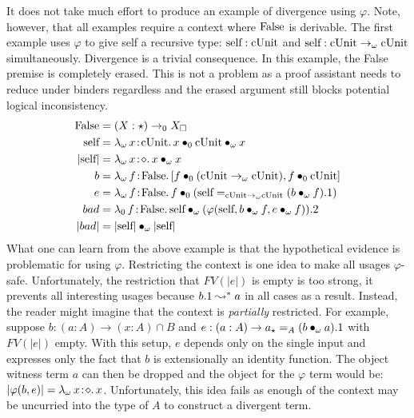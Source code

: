 It does not take much effort to produce an example of divergence using $\varphi$.
Note, however, that all examples require a context where $\textnormal{False}$ is derivable.
The first example uses $\varphi$ to give self a recursive type: $\textnormal{self} : \textnormal{cUnit}$ and $\textnormal{self} : \textnormal{cUnit} \to_\omega \textnormal{cUnit}$ simultaneously.
Divergence is a trivial consequence.
In this example, the False premise is completely erased.
This is not a problem as a proof assistant needs to reduce under binders regardless and the erased argument still blocks potential logical inconsistency.
\begin{align*}
    \pFalse &= (X : \star) \to_0 X_\square \\
    \pself &= \abs{\lambda_\omega}{x}{\pUnit}{
        \apptwo{x}{0}{\pUnit}{\omega}{x}
    } \\
    |\pself| &= \abs{\lambda_\omega}{x}{\diamond}{\app{x}{\omega}{x}} \\
    b &= \abs{\lambda_\omega}{f}{\pFalse}{
        [
            \app{f}{0}{(\pUnit \to_\omega \pUnit)},
            \app{f}{0}{\pUnit}
        ]
    } \\
    e &= \abs{\lambda_\omega}{f}{\pFalse}{
        \app{f}{0}{
            (\pself =_{\pUnit \to_\omega \pUnit} (\app{b}{\omega}{f}).1)
        }
    } \\
    bad &= \abs{\lambda_0}{f}{\pFalse}{
        \app{\pself}{\omega}{
            (
                \varphi(\pself, \app{b}{\omega}{f}, \app{e}{\omega}{f})
            ).2
        }
    } \\
    |bad| &= \app{|\pself|}{\omega}{|\pself|}
\end{align*}
What one can learn from the above example is that the hypothetical evidence is problematic for using $\varphi$.
Restricting the context is one idea to make all usages $\varphi$-safe.
Unfortunately, the restriction that $FV(|e|)$ is empty is too strong, it prevents all interesting usages because $b.1 \leadsto^* a$ in all cases as a result.
Instead, the reader might imagine that the context is \textit{partially} restricted.
For example, suppose $b : (a : A) \to (x : A) \cap B$ and $e : (a : A) \to a_\star =_A (b \bullet_{\omega} a).1$ with $FV(|e|)$ empty.
With this setup, $e$ depends only on the single input and expresses only the fact that $b$ is extensionally an identity function.
The object witness term $a$ can then be dropped and the object for the $\varphi$ term would be: $|\varphi(b, e)| = {\lambda_\omega}\, x\! : \! \diamond.\, x$.
Unfortunately, this idea fails as enough of the context may be uncurried into the type of $A$ to construct a divergent term.
